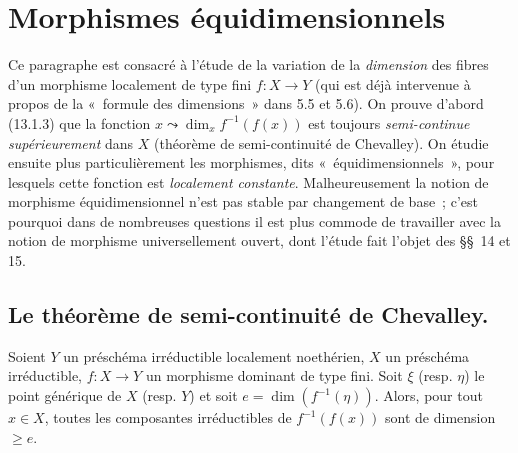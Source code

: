 \section{Morphismes équidimensionnels}
\label{section:IV.13-fr}

Ce paragraphe est consacré à l'étude de la variation de la \emph{dimension}
des fibres d'un morphisme localement de type fini $f:X\to Y$ (qui est déjà
intervenue à propos de la «~formule des dimensions~» dans 5.5 et 5.6). On
prouve d'abord (13.1.3) que la fonction
$x\leadsto\dim_x f^{-1}(f(x))$ est toujours \emph{semi-continue
supérieurement} dans $X$ (théorème de semi-continuité de Chevalley). On étudie
ensuite plus particulièrement les morphismes, dits «~équidimensionnels~», pour
lesquels cette fonction est \emph{localement constante}.
Malheureusement la notion de morphisme équidimensionnel n'est pas stable par
changement de base~; c'est pourquoi dans de nombreuses questions il est plus
commode de travailler avec la notion de morphisme universellement ouvert, dont
l'étude fait l'objet des \S\S~14 et 15.

\subsection{Le théorème de semi-continuité de Chevalley.}
\label{subsection:IV.13.1-fr}

\begin{lemma}[13.1.1]
\label{IV.13.1.1-fr}
Soient $Y$ un préschéma irréductible localement noethérien, $X$ un préschéma
irréductible, $f:X\to Y$ un morphisme dominant de type fini. Soit $\xi$
\textup{(resp. $\eta$)} le point générique de $X$ \textup{(resp. $Y$)} et soit
$e=\dim(f^{-1}(\eta))$. Alors, pour tout $x\in X$, toutes les composantes
irréductibles de $f^{-1}(f(x))$ sont de dimension $\geq e$.
\end{lemma}

